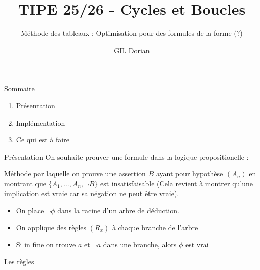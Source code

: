 \documentclass{beamer}
\title{TIPE 25/26 - Cycles et Boucles}
\author{GIL Dorian}
\subtitle{Méthode des tableaux : Optimisation pour des formules de la forme (?)}
\date{}
\begin{document}
\begin{frame}
\titlepage
\end{frame}

\begin{frame}{Sommaire}
\begin{enumerate}
    \item Présentation
    \item Implémentation
    \item Ce qui est à faire
\end{enumerate}
\end{frame}

\begin{frame}{Présentation}
    On souhaite prouver une formule dans la logique propositionelle :
    \begin{definition}
        Méthode par laquelle on prouve une assertion $B$ ayant pour hypothèse $(A_n)$ en montrant
        que $\{A_1,\dots,A_n, \lnot B\}$ est insatisfaisable (Cela revient à montrer qu'une implication est vraie car sa négation ne peut être vraie).
    \end{definition}
    \pause
    \begin{itemize}
        \item On place $\lnot\phi$ dans la racine d'un arbre de déduction.
        \item On applique des règles $(R_x)$ à chaque branche de l'arbre
        \item Si in fine on trouve $a$ et $\lnot a$ dans une branche, alors $\phi$ est vrai
    \end{itemize}
    \pause
    Les règles
\end{frame}
\end{document}
